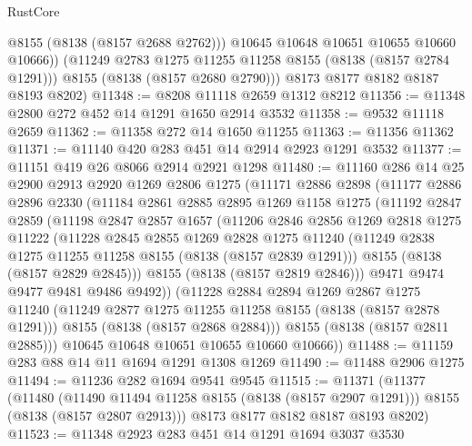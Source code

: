 \begin{lexlean}{RustCore}
\begin{coremodule}
              @8155
              (@8138 (@8157 @2688 @2762)))
            @10645
            @10648
            @10651
            @10655
            @10660
            @10666))
        (@11249 @2783 @1275 @11255 @11258 @8155 (@8138 (@8157 @2784 @1291)))
        @8155
        (@8138 (@8157 @2680 @2790)))
      @8173
      @8177
      @8182
      @8187
      @8193
      @8202)
@11348 := @8208 @11118 @2659 @1312 @8212
@11356 := @11348 @2800 @272 @452 @14 @1291 @1650 @2914 @3532
@11358 := @9532 @11118 @2659
@11362 := @11358 @272 @14 @1650 @11255
@11363 := @11356 @11362
@11371 := @11140 @420 @283 @451 @14 @2914 @2923 @1291 @3532
@11377 := @11151 @419 @26 @8066 @2914 @2921 @1298
@11480 := @11160
    @286
    @14
    @25
    @2900
    @2913
    @2920
    @1269
    @2806
    @1275
    (@11171
      @2886
      @2898
      (@11177
        @2886
        @2896
        @2330
        (@11184
          @2861
          @2885
          @2895
          @1269
          @1158
          @1275
          (@11192
            @2847
            @2859
            (@11198
              @2847
              @2857
              @1657
              (@11206
                @2846
                @2856
                @1269
                @2818
                @1275
                @11222
                (@11228
                  @2845
                  @2855
                  @1269
                  @2828
                  @1275
                  @11240
                  (@11249 @2838 @1275 @11255 @11258 @8155 (@8138 (@8157 @2839 @1291)))
                  @8155
                  (@8138 (@8157 @2829 @2845)))
                @8155
                (@8138 (@8157 @2819 @2846)))
              @9471
              @9474
              @9477
              @9481
              @9486
              @9492))
          (@11228
            @2884
            @2894
            @1269
            @2867
            @1275
            @11240
            (@11249 @2877 @1275 @11255 @11258 @8155 (@8138 (@8157 @2878 @1291)))
            @8155
            (@8138 (@8157 @2868 @2884)))
          @8155
          (@8138 (@8157 @2811 @2885)))
        @10645
        @10648
        @10651
        @10655
        @10660
        @10666))
@11488 := @11159 @283 @88 @14 @11 @1694 @1291 @1308 @1269
@11490 := @11488 @2906 @1275
@11494 := @11236 @282 @1694 @9541 @9545
@11515 := @11371
    (@11377
      (@11480
        (@11490 @11494 @11258 @8155 (@8138 (@8157 @2907 @1291)))
        @8155
        (@8138 (@8157 @2807 @2913)))
      @8173
      @8177
      @8182
      @8187
      @8193
      @8202)
@11523 := @11348 @2923 @283 @451 @14 @1291 @1694 @3037 @3530

\end{coremodule}
\end{lexlean}
